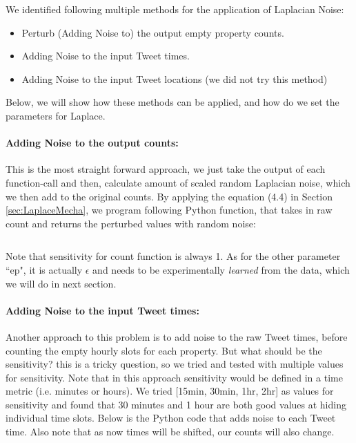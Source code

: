 \documentclass[12pt]{report}
\theoremstyle{named}
\begin{document}
We identified following multiple methods for the application of Laplacian Noise:
\begin{itemize}
  \item Perturb (Adding Noise to) the output empty property counts.
  \item Adding Noise to the input Tweet times.
  \item Adding Noise to the input Tweet locations (we did not try this method)
\end{itemize}

Below, we will show how these methods can be applied, and how do we set the parameters for Laplace.

\paragraph{Adding Noise to the output counts:\\}
This is the most straight forward approach, we just take the output of each function-call and then, calculate amount of scaled random Laplacian noise, which we then add to the original counts.
By applying the equation (4.4) in Section \ref{sec:LaplaceMecha}, we program following Python function, that takes in raw count and returns the perturbed values with random noise:

\inputminted{python}{AddLaplaceCount.py}

Note that sensitivity for count function is always 1. As for the other parameter ``ep", it is actually $\epsilon$ and needs to be experimentally \textit{learned} from the data, which we will do in next section.


\paragraph{Adding Noise to the input Tweet times:\\}
Another approach to this problem is to add noise to the raw Tweet times, before counting the empty hourly slots for each property. But what should be the sensitivity? this is a tricky question, so we tried and tested with multiple values for sensitivity. Note that in this approach sensitivity would be defined in a time metric (i.e. minutes or hours). We tried [15min, 30min, 1hr, 2hr] as values for sensitivity and found that 30 minutes and 1 hour are both good values at hiding individual time slots. Below is the Python code that adds noise to each Tweet time. Also note that as now times will be shifted, our counts will also change.
\end{document}
